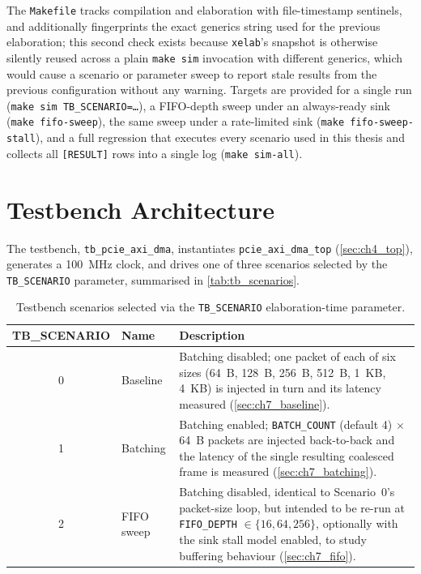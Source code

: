 The \texttt{Makefile} tracks compilation and elaboration with file-timestamp sentinels, and additionally fingerprints the exact generics string used for the previous elaboration; this second check exists because \texttt{xelab}'s snapshot is otherwise silently reused across a plain \texttt{make sim} invocation with different generics, which would cause a scenario or parameter sweep to report stale results from the previous configuration without any warning. Targets are provided for a single run (\texttt{make sim TB\_SCENARIO=\ldots}), a FIFO-depth sweep under an always-ready sink (\texttt{make fifo-sweep}), the same sweep under a rate-limited sink (\texttt{make fifo-sweep-stall}), and a full regression that executes every scenario used in this thesis and collects all \texttt{[RESULT]} rows into a single log (\texttt{make sim-all}).


\section{Testbench Architecture}
\label{sec:ch6_testbench}

The testbench, \texttt{tb\_pcie\_axi\_dma}, instantiates \texttt{pcie\_axi\_dma\_top} (\autoref{sec:ch4_top}), generates a 100~MHz clock, and drives one of three scenarios selected by the \texttt{TB\_SCENARIO} parameter, summarised in \autoref{tab:tb_scenarios}.

\begin{table}[htbp]
\centering
\begin{tabular}{@{}clp{7.2cm}@{}}
\toprule
\textbf{TB\_SCENARIO} & \textbf{Name} & \textbf{Description} \\
\midrule
0 & Baseline    & Batching disabled; one packet of each of six sizes (64~B, 128~B, 256~B, 512~B, 1~KB, 4~KB) is injected in turn and its latency measured (\autoref{sec:ch7_baseline}). \\
1 & Batching    & Batching enabled; \texttt{BATCH\_COUNT} (default 4) $\times$ 64~B packets are injected back-to-back and the latency of the single resulting coalesced frame is measured (\autoref{sec:ch7_batching}). \\
2 & FIFO sweep  & Batching disabled, identical to Scenario~0's packet-size loop, but intended to be re-run at \texttt{FIFO\_DEPTH} $\in \{16, 64, 256\}$, optionally with the sink stall model enabled, to study buffering behaviour (\autoref{sec:ch7_fifo}). \\
\bottomrule
\end{tabular}
\caption{Testbench scenarios selected via the \texttt{TB\_SCENARIO} elaboration-time parameter.}
\label{tab:tb_scenarios}
\end{table}

